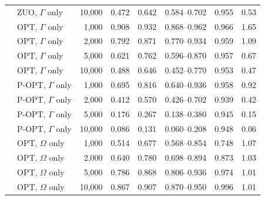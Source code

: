 \begin{tabular}{llrrrrrr}
 & ZUO, \(\Gamma\) only & 10,000 & 0.472 & 0.642 & 0.584--0.702 & 0.955 & 0.53\\
 & OPT, \(\Gamma\) only & 1,000 & 0.908 & 0.932 & 0.868--0.962 & 0.966 & 1.65\\
 & OPT, \(\Gamma\) only & 2,000 & 0.792 & 0.871 & 0.770--0.934 & 0.959 & 1.09\\
 & OPT, \(\Gamma\) only & 5,000 & 0.621 & 0.762 & 0.596--0.870 & 0.957 & 0.67\\
 & OPT, \(\Gamma\) only & 10,000 & 0.488 & 0.646 & 0.452--0.770 & 0.953 & 0.47\\
 & P-OPT, \(\Gamma\) only & 1,000 & 0.695 & 0.816 & 0.640--0.936 & 0.958 & 0.92\\
 & P-OPT, \(\Gamma\) only & 2,000 & 0.412 & 0.570 & 0.426--0.702 & 0.939 & 0.42\\
 & P-OPT, \(\Gamma\) only & 5,000 & 0.176 & 0.267 & 0.138--0.380 & 0.945 & 0.15\\
 & P-OPT, \(\Gamma\) only & 10,000 & 0.086 & 0.131 & 0.060--0.208 & 0.948 & 0.06\\
 & OPT, \(\Omega\) only & 1,000 & 0.514 & 0.677 & 0.568--0.854 & 0.748 & 1.07\\
 & OPT, \(\Omega\) only & 2,000 & 0.640 & 0.780 & 0.698--0.894 & 0.873 & 1.03\\
 & OPT, \(\Omega\) only & 5,000 & 0.786 & 0.868 & 0.806--0.936 & 0.974 & 1.01\\
 & OPT, \(\Omega\) only & 10,000 & 0.867 & 0.907 & 0.870--0.950 & 0.996 & 1.01\\
\bottomrule
\end{tabular}
